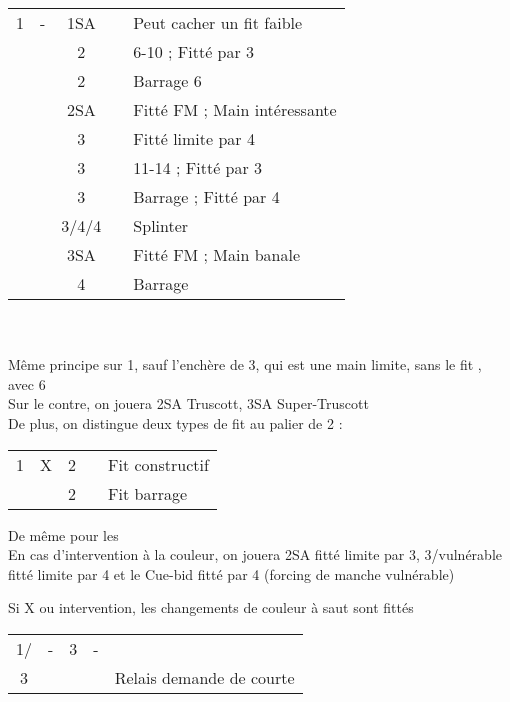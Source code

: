 \documentclass[a4paper, oneside, 11pt]{report}
\begin{document}
	\begin{tabular}{cccc|l}
	1\coeur & - & 1SA && Peut cacher un fit faible\\
	&& 2\coeur && 6-10 ; Fitté par 3\\
	&& 2\pique && Barrage 6\pique\\
	&& 2SA && Fitté FM ; Main intéressante\\
	&& 3\trefle && Fitté limite par 4\\
	&& 3\carreau && 11-14 ; Fitté par 3\\
	&& 3\coeur && Barrage ; Fitté par 4\\
	&& 3\pique/4\trefle/4\carreau && Splinter\\
	&& 3SA && Fitté FM ; Main banale\\
	&& 4\coeur && Barrage\\
	\end{tabular}\\\\

	Même principe sur 1\pique, sauf l'enchère de 3\coeur, qui est une main limite, sans le fit \pique, avec 6\coeur\\

		Sur le contre, on jouera 2SA Truscott, 3SA Super-Truscott\\
		De plus, on distingue deux types de fit au palier de 2 :

		\begin{tabular}{cccc|l}
		1\coeur & X & 2\carreau && Fit constructif\\
		&& 2\coeur && Fit barrage\\
		\end{tabular}
		
		De même pour les \pique\\

		En cas d'intervention à la couleur, on jouera 2SA fitté limite par 3,  3\coeur/\pique vulnérable fitté limite par 4 et le Cue-bid fitté par 4 (forcing de manche vulnérable)
		
		Si X ou intervention, les changements de couleur à saut sont fittés\\

		\begin{tabular}{cccc|l}
		1\coeur/\pique & - & 3\trefle & - &\\
		3\carreau &&&& Relais demande de courte\\
		\end{tabular}\\\\
		
\end{document}
